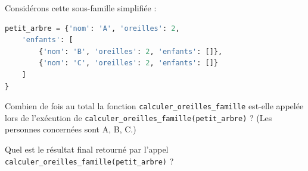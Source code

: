 \begin{Exercise}[title={Fonction Récursive}]
Considérons cette sous-famille simplifiée :

\begin{lstlisting}[language=Python]
petit_arbre = {'nom': 'A', 'oreilles': 2, 
    'enfants': [
        {'nom': 'B', 'oreilles': 2, 'enfants': []},
        {'nom': 'C', 'oreilles': 2, 'enfants': []}
    ]
}
\end{lstlisting}

\Question Combien de fois au total la fonction \texttt{calculer\_oreilles\_famille} est-elle appelée lors de l'exécution de \texttt{calculer\_oreilles\_famille(petit\_arbre)} ? (Les personnes concernées sont A, B, C.)\\

\emptybox{1cm}

\Question Quel est le résultat final retourné par l'appel \texttt{calculer\_oreilles\_famille(petit\_arbre)} ?\\

\emptybox{1cm}


\end{Exercise}